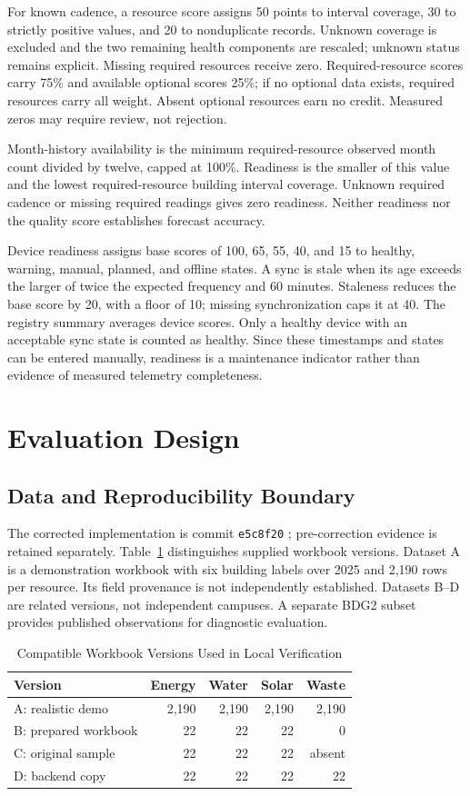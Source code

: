 \documentclass[conference]{IEEEtran}
\begin{document}
For known cadence, a resource score assigns 50 points to interval coverage, 30 to strictly positive values, and 20 to nonduplicate records. Unknown coverage is excluded and the two remaining health components are rescaled; unknown status remains explicit. Missing required resources receive zero. Required-resource scores carry 75\% and available optional scores 25\%; if no optional data exists, required resources carry all weight. Absent optional resources earn no credit. Measured zeros may require review, not rejection.

Month-history availability is the minimum required-resource observed month count divided by twelve, capped at 100\%. Readiness is the smaller of this value and the lowest required-resource building interval coverage. Unknown required cadence or missing required readings gives zero readiness. Neither readiness nor the quality score establishes forecast accuracy.

Device readiness assigns base scores of 100, 65, 55, 40, and 15 to healthy, warning, manual, planned, and offline states. A sync is stale when its age exceeds the larger of twice the expected frequency and 60 minutes. Staleness reduces the base score by 20, with a floor of 10; missing synchronization caps it at 40. The registry summary averages device scores. Only a healthy device with an acceptable sync state is counted as healthy. Since these timestamps and states can be entered manually, readiness is a maintenance indicator rather than evidence of measured telemetry completeness.

\section{Evaluation Design}
\subsection{Data and Reproducibility Boundary}
The corrected implementation is commit \texttt{e5c8f20} \cite{repository}; pre-correction evidence is retained separately. Table~\ref{tab:data} distinguishes supplied workbook versions. Dataset A is a demonstration workbook with six building labels over 2025 and 2,190 rows per resource. Its field provenance is not independently established. Datasets B--D are related versions, not independent campuses. A separate BDG2 subset provides published observations for diagnostic evaluation.

\begin{table}[t]
\caption{Compatible Workbook Versions Used in Local Verification}
\label{tab:data}
\centering\footnotesize
\begin{tabular}{lrrrr}
\toprule
Version & Energy & Water & Solar & Waste\\
\midrule
A: realistic demo & 2,190 & 2,190 & 2,190 & 2,190\\
B: prepared workbook & 22 & 22 & 22 & 0\\
C: original sample & 22 & 22 & 22 & absent\\
D: backend copy & 22 & 22 & 22 & 22\\
\bottomrule
\end{tabular}
\end{table}
\end{document}
